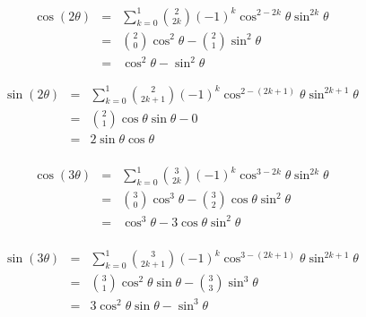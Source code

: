 \documentclass[letterpaper,12pt,fleqn]{article}
\renewcommand{\o}{\theta}
\begin{document}
\begin{example}
\begin{eqnarray*}
\cos(2\o) &=& \sum_{k=0}^1\binom{2}{2k}(-1)^k\cos^{2-2k}\o\sin^{2k}\o \\
    &=& \binom{2}{0}\cos^2\o-\binom{2}{1}\sin^2\o \\
    &=& \cos^2\o-\sin^2\o
\end{eqnarray*}

\begin{eqnarray*}
\sin(2\o) &=& \sum_{k=0}^1\binom{2}{2k+1}(-1)^k\cos^{2-(2k+1)}\o\sin^{2k+1}\o \\
    &=& \binom{2}{1}\cos\o\sin\o-0 \\
    &=& 2\sin\o\cos\o \\
\end{eqnarray*}

\begin{eqnarray*}
\cos(3\o) &=& \sum_{k=0}^1\binom{3}{2k}(-1)^k\cos^{3-2k}\o\sin^{2k}\o \\
    &=& \binom{3}{0}\cos^3\o-\binom{3}{2}\cos\o\sin^2\o \\
    &=& \cos^3\o-3\cos\o\sin^2\o \\
\end{eqnarray*}

\begin{eqnarray*}
\sin(3\o) &=& \sum_{k=0}^1\binom{3}{2k+1}(-1)^k\cos^{3-(2k+1)}\o\sin^{2k+1}\o \\
    &=& \binom{3}{1}\cos^2\o\sin\o-\binom{3}{3}\sin^3\o \\
    &=& 3\cos^2\o\sin\o-\sin^3\o \\
\end{eqnarray*}
\end{example}
\end{document}
